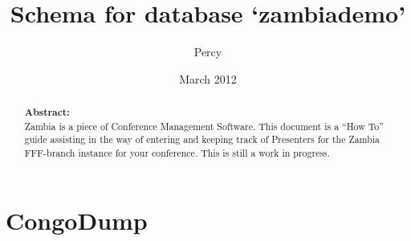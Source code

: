 \documentclass[tablesignature]{scrartcl}
\title{Schema for database `zambiademo'}
\author{Percy}
\date{March 2012}
\begin{document}
\maketitle


\thispagestyle{fancy}
\renewcommand{\headrulewidth}{0pt}
\renewcommand{\footrulewidth}{1pt}
\lhead{}
\rhead{}
\chead{}
\cfoot{}
\rfoot{\thepage}
\begin{abstract}
\vspace{5cm}
{\LARGE{\textbf{Abstract:\\}}}
Zambia is a piece of Conference Management Software.  This document is a ``How To'' guide assisting in the way of entering and keeping track of Presenters for the Zambia FFF-branch instance for your conference.  This is still a work in progress.
\end{abstract}
\newpage
\renewcommand{\headrulewidth}{1pt}
\tableofcontents
\newpage
{}
\section{CongoDump}
\label{sec-1}
\end{document}

